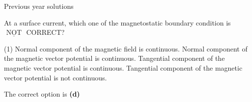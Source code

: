 \begin{center}
\end{center}
\newpage
\begin{abox}
	Previous year solutions
	\end{abox}
\begin{enumerate}
	\begin{minipage}{\textwidth}
		\item At a surface current, which one of the magnetostatic boundary condition is $\underline{\text { NOT }}$ CORRECT?
	\end{minipage}
	\begin{tasks}(1)
		\task[\textbf{A.}]Normal component of the magnetic field is continuous.
		\task[\textbf{B.}]Normal component of the magnetic vector potential is continuous.
		\task[\textbf{C.}]Tangential component of the magnetic vector potential is continuous.
		\task[\textbf{D.}]Tangential component of the magnetic vector potential is not continuous.
	\end{tasks}
	\begin{answer}
		The correct option is \textbf{(d)}
	\end{answer}

\end{enumerate}

